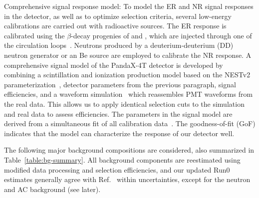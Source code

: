 \documentclass[%
 reprint,
superscriptaddress,
 amsmath,amssymb,
 aps,
 prl,
]{revtex4-1}
\begin{document}
Comprehensive signal response model: 
To model the ER and NR signal responses in the detector, as well as to optimize selection criteria, several low-energy calibrations are carried out with radioactive sources. The ER response is calibrated using the $\beta$-decay progenies of  and , which are injected through one of the circulation loops~\cite{Meng2021_P4First}. Neutrons produced by a deuterium-deuterium (DD) neutron generator or an Be source are employed to calibrate the NR response.
A comprehensive signal model of the PandaX-4T detector is developed by combining a scintillation and ionization production model based on the NESTv2 parameterization~\cite{NESTv2}, detector parameters from the previous paragraph, signal efficiencies, and a waveform simulation~\cite{Li2024_WfSim} which reassembles PMT waveforms from the real data. This allows us to apply identical selection cuts to the simulation and real data to assess efficiencies. The parameters in the signal model are derived from a simultaneous fit of all calibration data~\cite{Luo2024_P4SignalModel}.
The goodness-of-fit (GoF) indicates that the model can characterize the response of our detector well.






The following major background compositions are considered, also summarized in Table~\ref{table:bg-summary}. All background components are reestimated using modified data processing and selection efficiencies, and our updated Run0 estimates generally agree with Ref.~\cite{Meng2021_P4First} within uncertainties, except for the neutron and AC background (see later).
\end{document}

